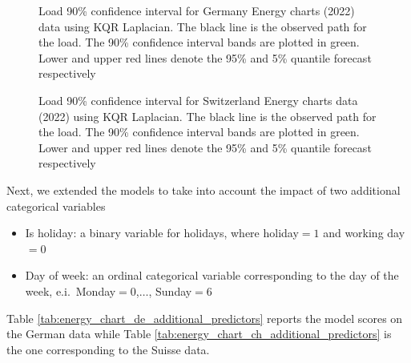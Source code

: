     \begin{figure}[!ht]
        \caption[Probabilistic forecast for load in Germany]{Load 90\% confidence interval for Germany Energy charts (2022) data using KQR Laplacian. The black line is the observed path for the load. The 90\% confidence interval bands are plotted in green. Lower and upper red lines denote the 95\% and 5\% quantile forecast respectively}
        \label{fig:DE_load_CI}
    \end{figure}
    

    \begin{figure}[!ht]
        \caption[Probabilistic forecast for load in Switzerland]{Load 90\% confidence interval for Switzerland Energy charts data (2022) using KQR Laplacian. The black line is the observed path for the load. The 90\% confidence interval bands are plotted in green. Lower and upper red lines denote the 95\% and 5\% quantile forecast respectively}
        \label{fig:CH_load_CI}
    \end{figure}
    
Next, we extended the models to take into account the impact of two additional categorical variables
\begin{itemize}
    \item Is holiday: a binary variable for holidays, where holiday$=1$ and working day$=0$
    \item Day of week: an ordinal categorical variable corresponding to the day of the week, e.i.\ Monday$=0$,$\dots$, Sunday$=6$
\end{itemize}
Table \ref{tab:energy_chart_de_additional_predictors} reports the model scores on the German data while Table \ref{tab:energy_chart_ch_additional_predictors} is the one corresponding to the Suisse data.

